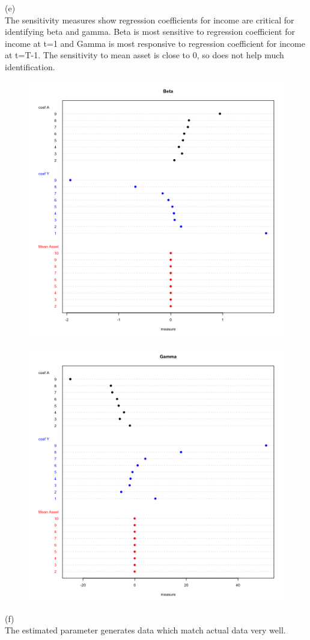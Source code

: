 \documentclass[paper=a4, fontsize=13pt]{extarticle} %
\numberwithin{equation}{section} %
\numberwithin{figure}{section} %
\numberwithin{table}{section} %
\begin{document}
(e) \\
The sensitivity measures show regression coefficients for income are critical for identifying beta and gamma. Beta is most sensitive to regression coefficient for income at t=1 and Gamma is most responsive to regression coefficient for income at t=T-1. The sensitivity to mean asset is close to 0, so does not help much identification. \\

\begin{figure}[H]
\centering
\includegraphics[width=0.6\linewidth]{BetaSensitivity}
\label{fig:betasensitivity}
\end{figure}
\begin{figure}[H]
\centering
\includegraphics[width=0.6\linewidth]{GammaSensitivity}
\label{fig:gammasensitivity}
\end{figure}

(f) \\
The estimated parameter generates data which match actual data  very well. 
\end{document}
